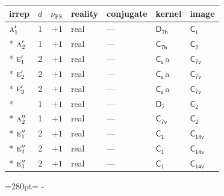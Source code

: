 \documentclass[10pt,a4paper]{article}
\newcommand{\needspace}[1]{\par\penalty-100\begingroup\dimen0=#1\relax\dimen2=\pagegoal
  \advance\dimen2-\pagetotal\ifdim\dimen0>\dimen2\relax\ifdim\dimen2>0pt\vfil\break\fi\fi
  \endgroup}
\numberwithin{equation}{section}
\newcommand{\grp}[1]{\mathsf{#1}}
\newcommand{\irr}[1]{\text{\normalfont\scshape #1}}
\newcommand{\detbox}[1]{{\setlength{\fboxsep}{1pt}\fbox{#1}}}
\newcommand{\clsletter}[1]{\,{\scriptsize\color{black!55}#1}}
\newcommand{\fsind}{\nu_{\mathrm{FS}}}
\begin{document}
{\small\renewcommand{\arraystretch}{1.25}\begin{longtable}{@{}lrrllll@{}}\toprule
irrep & $d$ & $\fsind$ & reality & conjugate & kernel & image\\\midrule\endhead
\bottomrule\endfoot\endlastfoot
$\irr{a}_{1}'$ & 1 & $+1$ & real & --- & \href{D7h.pdf}{$\grp{D_{7h}}$} & \href{C1.pdf}{$\grp{C_{1}}$}\\*
$\irr{a}_{2}'$ & 1 & $+1$ & real & --- & \href{C7h.pdf}{$\grp{C_{7h}}$} & \href{C2.pdf}{$\grp{C_{2}}$}\\*
$\irr{e}_{1}'$ & 2 & $+1$ & real & --- & \href{C1v.pdf}{$\grp{C_{s}}$}\clsletter{a} & \href{C7v.pdf}{$\grp{C_{7v}}$}\\*
$\irr{e}_{2}'$ & 2 & $+1$ & real & --- & \href{C1v.pdf}{$\grp{C_{s}}$}\clsletter{a} & \href{C7v.pdf}{$\grp{C_{7v}}$}\\*
$\irr{e}_{3}'$ & 2 & $+1$ & real & --- & \href{C1v.pdf}{$\grp{C_{s}}$}\clsletter{a} & \href{C7v.pdf}{$\grp{C_{7v}}$}\\*
\detbox{$\irr{a}_{1}''$} & 1 & $+1$ & real & --- & \href{D7.pdf}{$\grp{D_{7}}$} & \href{C2.pdf}{$\grp{C_{2}}$}\\*
$\irr{a}_{2}''$ & 1 & $+1$ & real & --- & \href{C7v.pdf}{$\grp{C_{7v}}$} & \href{C2.pdf}{$\grp{C_{2}}$}\\*
$\irr{e}_{1}''$ & 2 & $+1$ & real & --- & \href{C1.pdf}{$\grp{C_{1}}$} & $\grp{C_{14v}}$\\*
$\irr{e}_{2}''$ & 2 & $+1$ & real & --- & \href{C1.pdf}{$\grp{C_{1}}$} & $\grp{C_{14v}}$\\*
$\irr{e}_{3}''$ & 2 & $+1$ & real & --- & \href{C1.pdf}{$\grp{C_{1}}$} & $\grp{C_{14v}}$\\
\bottomrule\end{longtable}}
\needspace{280pt}
\end{document}

